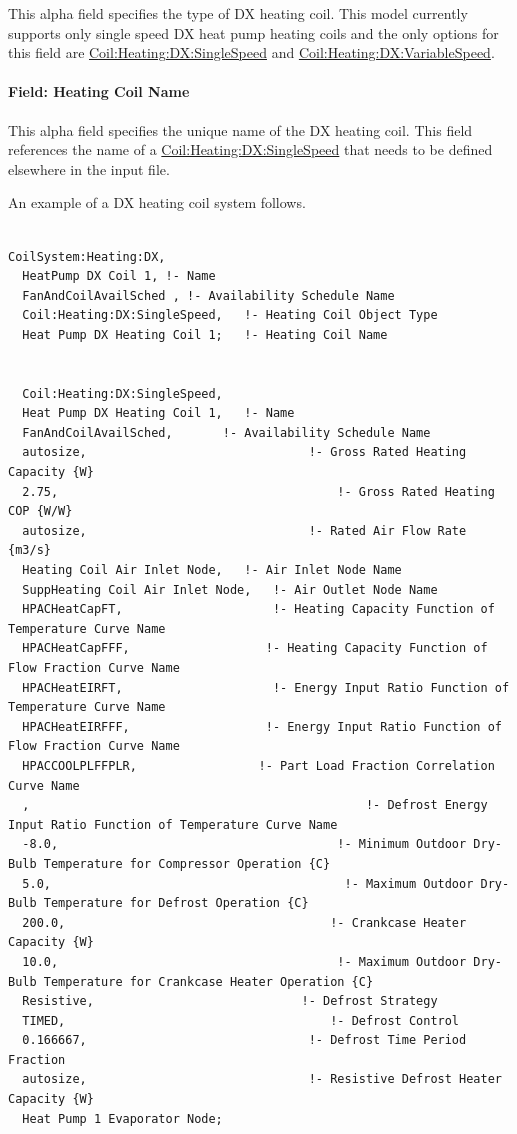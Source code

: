 This alpha field specifies the type of DX heating coil. This model currently supports only single speed DX heat pump heating coils and the only options for this field are \hyperref[coilheatingdxsinglespeed]{Coil:Heating:DX:SingleSpeed} and \hyperref[coilheatingdxvariablespeed]{Coil:Heating:DX:VariableSpeed}.

\paragraph{Field: Heating Coil Name}\label{field-heating-coil-name-000}

This alpha field specifies the unique name of the DX heating coil. This field references the name of a \hyperref[coilheatingdxsinglespeed]{Coil:Heating:DX:SingleSpeed} that needs to be defined elsewhere in the input file.

An example of a DX heating coil system follows.

\begin{lstlisting}

CoilSystem:Heating:DX,
  HeatPump DX Coil 1, !- Name
  FanAndCoilAvailSched , !- Availability Schedule Name
  Coil:Heating:DX:SingleSpeed,   !- Heating Coil Object Type
  Heat Pump DX Heating Coil 1;   !- Heating Coil Name


  Coil:Heating:DX:SingleSpeed,
  Heat Pump DX Heating Coil 1,   !- Name
  FanAndCoilAvailSched,       !- Availability Schedule Name
  autosize,                               !- Gross Rated Heating Capacity {W}
  2.75,                                       !- Gross Rated Heating COP {W/W}
  autosize,                               !- Rated Air Flow Rate {m3/s}
  Heating Coil Air Inlet Node,   !- Air Inlet Node Name
  SuppHeating Coil Air Inlet Node,   !- Air Outlet Node Name
  HPACHeatCapFT,                     !- Heating Capacity Function of Temperature Curve Name
  HPACHeatCapFFF,                   !- Heating Capacity Function of Flow Fraction Curve Name
  HPACHeatEIRFT,                     !- Energy Input Ratio Function of Temperature Curve Name
  HPACHeatEIRFFF,                   !- Energy Input Ratio Function of Flow Fraction Curve Name
  HPACCOOLPLFFPLR,                 !- Part Load Fraction Correlation Curve Name
  ,                                               !- Defrost Energy Input Ratio Function of Temperature Curve Name
  -8.0,                                       !- Minimum Outdoor Dry-Bulb Temperature for Compressor Operation {C}
  5.0,                                         !- Maximum Outdoor Dry-Bulb Temperature for Defrost Operation {C}
  200.0,                                     !- Crankcase Heater Capacity {W}
  10.0,                                       !- Maximum Outdoor Dry-Bulb Temperature for Crankcase Heater Operation {C}
  Resistive,                             !- Defrost Strategy
  TIMED,                                     !- Defrost Control
  0.166667,                               !- Defrost Time Period Fraction
  autosize,                               !- Resistive Defrost Heater Capacity {W}
  Heat Pump 1 Evaporator Node;
\end{lstlisting}

